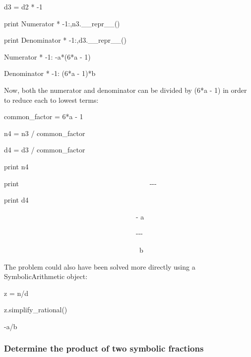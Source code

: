 \documentclass[12pt,twoside]{book}
\begin{document}
d3 = d2 * {}-1

print {\textquotedbl}Numerator * {}-1:{\textquotedbl},n3.\_\_repr\_\_()

print {\textquotedbl}Denominator * {}-1:{\textquotedbl},d3.\_\_repr\_\_()

{\textbar}

Numerator * {}-1: {}-a*(6*a {}- 1)

Denominator * {}-1: (6*a {}- 1)*b


\bigskip

{\textquotedbl}{\textquotedbl}{\textquotedbl}

Now, both the numerator and denominator can be divided by (6*a {}- 1) in order to reduce each to lowest terms:

{\textquotedbl}{\textquotedbl}{\textquotedbl}

common\_factor = 6*a {}- 1

n4 = n3 / common\_factor

d4 = d3 / common\_factor

print n4

print {\textquotedbl}
\ \ \ \ \ \ \ \ \ \ \ \ \ \ \ \ \ \ \ \ \ \ \ \ \ \ \ \ \ \ \ \ \ \ \ \ \ {}-{}-{}-{\textquotedbl}

print d4

{\textbar}

\ \ \ \ \ \ \ \ \ \ \ \ \ \ \ \ \ \ \ \ \ \ \ \ \ \ \ \ \ \ \ \ \ \ \ \ \ \ {}-
a

\ \ \ \ \ \ \ \ \ \ \ \ \ \ \ \ \ \ \ \ \ \ \ \ \ \ \ \ \ \ \ \ \ \ \ \ \ \ {}-{}-{}-

\ \ \ \ \ \ \ \ \ \ \ \ \ \ \ \ \ \ \ \ \ \ \ \ \ \ \ \ \ \ \ \ \ \ \ \ \ \ \ b


\bigskip

{\textquotedbl}{\textquotedbl}{\textquotedbl}

The problem could also have been solved more directly using a SymbolicArithmetic object:

{\textquotedbl}{\textquotedbl}{\textquotedbl}

z = n/d

z.simplify\_rational()

{\textbar}

{}-a/b


\bigskip

\subsubsection[Determine the product of two symbolic fractions]{Determine the product of two symbolic fractions}
\end{document}
